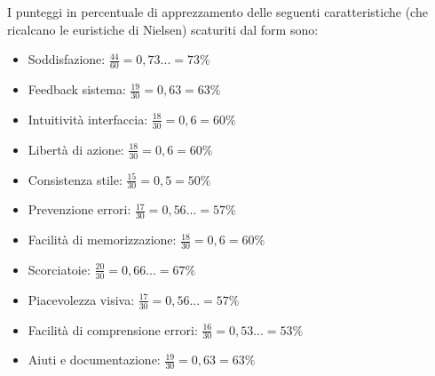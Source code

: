         I punteggi in percentuale di apprezzamento delle seguenti caratteristiche (che ricalcano le euristiche di Nielsen) scaturiti dal form sono:
        \begin{itemize}
            \item Soddisfazione: $\frac{44}{60} = 0,73... = 73\%$
            \item Feedback sistema: $\frac{19}{30} = 0,63 = 63\%$
            \item Intuitività interfaccia: $\frac{18}{30} = 0,6 = 60\%$
            \item Libertà di azione: $\frac{18}{30} = 0,6 = 60\%$
            \item Consistenza stile: $\frac{15}{30} = 0,5 = 50\%$
            \item Prevenzione errori: $\frac{17}{30} = 0,56... = 57\%$
            \item Facilità di memorizzazione: $\frac{18}{30} = 0,6 = 60\%$
            \item Scorciatoie: $\frac{20}{30} = 0,66... = 67\%$
            \item Piacevolezza visiva: $\frac{17}{30} = 0,56... = 57\%$
            \item Facilità di comprensione errori: $\frac{16}{30} = 0,53... = 53\%$
            \item Aiuti e documentazione: $\frac{19}{30} = 0,63 = 63\%$
        \end{itemize}

